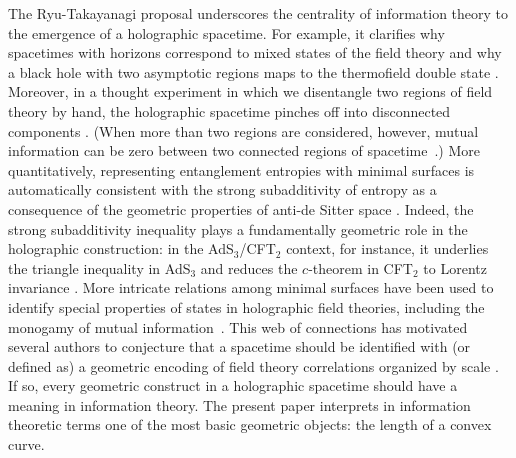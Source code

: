 \documentclass[12pt]{article}
\begin{document}
The Ryu-Takayanagi proposal underscores the centrality of information theory to the emergence of a holographic spacetime. For example, it clarifies why spacetimes with horizons correspond to mixed states of the field theory and why a black hole with two asymptotic regions maps to the thermofield double state \cite{Horowitz:1998xk, Balasubramanian:1998de, Maldacena:2001kr}. Moreover, in a thought experiment in which we disentangle two regions of field theory by hand, the holographic spacetime pinches off into disconnected components \cite{markessay, rqg}. (When more than two regions are considered, however, mutual information can be zero between two connected regions of spacetime~\cite{balasubramanian2014multiboundary}.) More quantitatively, representing entanglement entropies with minimal surfaces is automatically consistent with the strong subadditivity of entropy as a consequence of  the geometric properties of anti-de Sitter space \cite{ssaproof}. Indeed, the strong subadditivity inequality plays a fundamentally geometric role in the holographic construction: in the AdS$_3$/CFT$_2$ context, for instance, it underlies the triangle inequality in AdS$_3$ \cite{lampros} and reduces the $c$-theorem in CFT$_2$ to Lorentz invariance \cite{ssalorentz}. More intricate relations among minimal surfaces have been used to identify special properties of states in holographic field theories, including the monogamy of mutual information~\cite{monogamy}.
This web of connections has motivated several authors to conjecture that a spacetime should be identified with (or defined as) a geometric encoding of field theory correlations organized by scale \cite{briansessay, marks1st, markessay, brians2nd, bianchimyers, tomjuan, myerssmolkin, holeentropy, erepr, xiaoliang, complexity}. If so, every geometric construct in a holographic spacetime should have a meaning in information theory. The present paper interprets in information theoretic terms one of the most basic geometric objects: the length of a convex curve.
\end{document}
